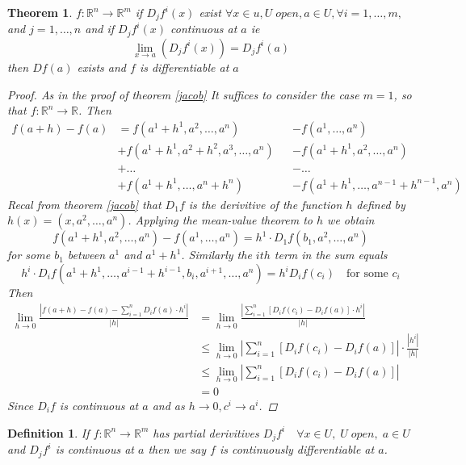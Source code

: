 \documentclass[12pt]{article}
\def\RR{\mathbb{R}}
\newtheorem{theorem}{Theorem}[section]
\newtheorem{definition}{Definition}[section]
\begin{document}
\begin{theorem}
 $f:\RR^n \rightarrow \RR^m $ if $D_{j}f^{i}(x)$ exist $ \forall x \in u, U\; open,  a \in U,  \forall i = 1,\dots, m,$ and $ j = 1, \dots, n$ and if $D_{j}f^{i}(x)$ continuous at $a$ ie 
\[\lim_{x \rightarrow a}(D_{j}f^{i}(x)) = D_{j}f^{i}(a)\]
then $Df(a)$ exists and $f$ is differentiable at $a$
\begin{proof}
As in the proof of theorem \ref{jacob} It suffices to consider the case $ m=1$, so that $f:\RR^n \rightarrow \RR$. Then
\begin{align*}
f(a+ h) - f(a) &= f(a^{1} + h^{1}, a^{2}, \dots , a^{n}) &&- f(a^{1}, \dots , a^{n})\\
&+ f(a^1 + h^1 , a^2 + h^2, a^3 , \dots , a^n ) &&-  f(a^{1} + h^1 , a^2 ,  \dots , a^{n})\\
&+ \dots  &&- \dots\\
&+ f(a^1 + h^1 ,\dots ,  a^n + h^n ) &&-  f(a^{1} + h^1 ,  \dots, a^{n-1} + h^{n-1} , a^{n})
\end{align*}
Recal from theorem \ref{jacob} that $D_{1}f$ is the derivitive of the function $h$ defined by\\ $h(x) = (x, a^2 , \dots , a^n )$. Applying the mean-value theorem to $h$ we obtain
\[ f(a^{1} + h^{1}, a^{2}, \dots , a^{n}) - f(a^{1}, \dots , a^{n}) = h^{1} \cdot D_{1}f(b_{1}, a^{2} , \dots, a^{n}) \]
for some $b_{1}$ between $a^1 $ and $a^1 + h^1 $. Similarly the $ith$ term in the sum equals 
\[h^{i} \cdot D_{i}f(a^1 + h^1 ,\dots ,  a^{i-1} + h^{i-1},  b_{i}, a^{i+1}, \dots , a^n ) = h^{i}D_{i}f(c_{i}) \quad \text{for some $c_{i}$} \]
Then
\begin{align*}
\lim_{h \rightarrow 0}\frac{|f(a+h) - f(a) - \sum_{i=1}^{n}D_{i}f(a) \cdot h^{i}|}{|h|} &= \lim_{h \rightarrow 0}\frac{| \sum_{i=1}^{n}[D_{i}f(c_{i}) - D_{i}f(a) ]\cdot h^{i}|}{|h|}\\
 & \leq \lim_{h \rightarrow 0}| \sum_{i=1}^{n}[D_{i}f(c_{i}) - D_{i}f(a)]|\cdot \frac{| h^{i}|}{|h|}\\
 & \leq \lim_{h \rightarrow 0}| \sum_{i=1}^{n}[D_{i}f(c_{i}) - D_{i}f(a)]|\\
&=0
\end{align*}
Since $D_{i}f$ is continuous at $a$ and as $h \rightarrow 0, c^{i} \rightarrow  a^{i}$.
\end{proof}
\end{theorem}

\begin{definition} If $f:\RR^n \rightarrow \RR^m$ has partial derivitives $ D_{j}f^{i} \quad \forall x \in U , \; U \; open, \;  a \in U$ and $D_{j}f^{i}$ is continuous at $a$ then we say $f$ is continuously differentiable at $a$. 
\end{definition}
\end{document}
